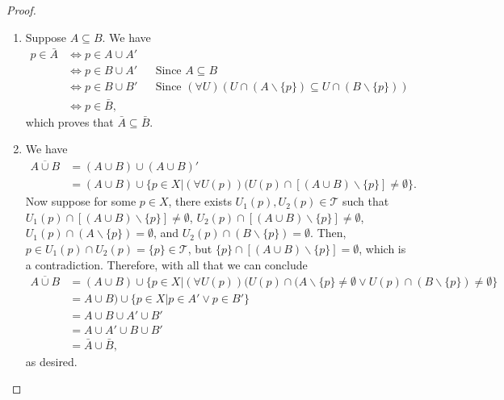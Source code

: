 \documentclass[12pt,a4paper]{article}
\theoremstyle{theorem}
\theoremstyle{definition}
\newcommand{\Tau}{\mathcal{T}}
\begin{document}
\begin{proof}
\begin{enumerate}
\item Suppose $A \subseteq B$. We have
\begin{align*}
p \in \bar{A} &\iff p \in A \cup A' \\
&\iff p \in B \cup A' &&\text{Since }A \subseteq B\\
&\iff p \in B \cup B' &&\text{Since }(\forall U)(U \cap (A \backslash \{p \}) \subseteq  U \cap (B \backslash \{p \}))\\
&\iff p \in \bar{B} \text{,}
\end{align*}
which proves that $\bar{A} \subseteq \bar{B}$.
\item We have
\begin{align*}
\overline{A \cup B} &= (A \cup B) \cup (A \cup B)'\\
&= (A \cup B) \cup \{p \in X | (\forall U(p))(U(p) \cap [(A \cup B)\backslash \{ p\}] \not = \emptyset \}.
\end{align*}
Now suppose for some $p \in X$,  there exists $U_1(p), U_2(p) \in \Tau$ such that $U_1(p) \cap [(A \cup B)\backslash \{ p\}] \not = \emptyset$,  $U_2(p) \cap [(A \cup B)\backslash \{ p\}] \not = \emptyset$,  $U_1(p) \cap (A \backslash \{ p\}) = \emptyset$,  and $U_2(p) \cap (B \backslash \{ p\}) = \emptyset$. Then, $p \in U_1(p) \cap U_2(p) = \{p\} \in \Tau$, but $\{p \} \cap [(A \cup B)\backslash \{ p\}]  = \emptyset$, which is a contradiction. Therefore, with all that we can conclude
\begin{align*}
\overline{A \cup B} &= (A \cup B) \cup \{p \in X | (\forall U(p))(U(p) \cap (A\backslash \{ p\} \not = \emptyset \lor U(p) \cap (B\backslash \{ p\}) \not = \emptyset \}\\
&= A \cup B) \cup \{p \in X | p \in A' \lor p \in B' \}\\
&= A \cup B \cup A' \cup B'\\
&= A \cup A' \cup B \cup B'\\
&= \bar{A} \cup \bar{B} \text{,}
\end{align*}
as desired.
\end{enumerate}
\end{proof}
\end{document}
